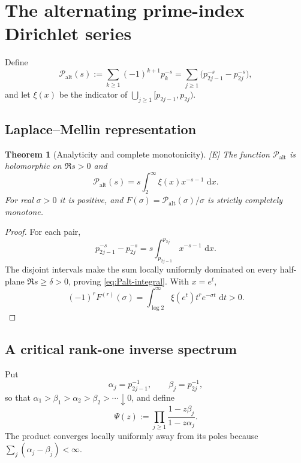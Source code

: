 \documentclass[11pt]{article}
\newtheorem{theorem}{Theorem}[section]
\theoremstyle{definition}
\theoremstyle{remark}
\newcommand{\Palt}{\mathcal P_{\mathrm{alt}}}
\newcommand{\status}[1]{\textnormal{\textcolor{accent}{\footnotesize[#1]}}}
\newcommand{\dd}{\,\mathrm d}
\begin{document}
\section{The alternating prime-index Dirichlet series}

Define
\begin{equation}\label{eq:Palt}
 \Palt(s):=\sum_{k\ge1}(-1)^{k+1}p_k^{-s}
 =\sum_{j\ge1}\bigl(p_{2j-1}^{-s}-p_{2j}^{-s}\bigr),
\end{equation}
and let $\xi(x)$ be the indicator of
$\bigcup_{j\ge1}[p_{2j-1},p_{2j})$.

\subsection{Laplace--Mellin representation}

\begin{theorem}[Analyticity and complete monotonicity]\label{thm:Palt-integral}
\status{E}
The function $\Palt$ is holomorphic on $\Re s>0$ and
\begin{equation}\label{eq:Palt-integral}
 \Palt(s)=s\int_2^\infty\xi(x)x^{-s-1}\,\dd x.
\end{equation}
For real $\sigma>0$ it is positive, and
$F(\sigma)=\Palt(\sigma)/\sigma$ is strictly completely monotone.
\end{theorem}

\begin{proof}
For each pair,
\[
 p_{2j-1}^{-s}-p_{2j}^{-s}
 =s\int_{p_{2j-1}}^{p_{2j}}x^{-s-1}\,\dd x.
\]
The disjoint intervals make the sum locally uniformly dominated on every half-plane
$\Re s\ge\delta>0$, proving \eqref{eq:Palt-integral}.  With $x=e^t$,
\[
 (-1)^rF^{(r)}(\sigma)
 =\int_{\log2}^{\infty}\xi(e^t)t^re^{-\sigma t}\,\dd t>0.
\]
\end{proof}

\subsection{A critical rank-one inverse spectrum}

Put
\[
 \alpha_j=p_{2j-1}^{-1},\qquad \beta_j=p_{2j}^{-1},
\]
so that $\alpha_1>\beta_1>\alpha_2>\beta_2>\cdots\downarrow0$, and define
\begin{equation}\label{eq:prime-perturbation-product}
 \Psi(z):=\prod_{j\ge1}\frac{1-z\beta_j}{1-z\alpha_j}.
\end{equation}
The product converges locally uniformly away from its poles because
$\sum_j(\alpha_j-\beta_j)<\infty$.
\end{document}
